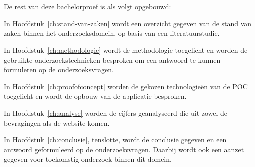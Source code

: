 
\section{}%
\label{sec:opzet-bachelorproef}

De rest van deze bachelorproef is als volgt opgebouwd:

In Hoofdstuk~\ref{ch:stand-van-zaken} wordt een overzicht gegeven van de stand van zaken binnen het onderzoeksdomein, op basis van een literatuurstudie.

In Hoofdstuk~\ref{ch:methodologie} wordt de methodologie toegelicht en worden de gebruikte onderzoekstechnieken besproken om een antwoord te kunnen formuleren op de onderzoeksvragen.

In Hoofdstuk~\ref{ch:proofofconcept} worden de gekozen technologieën van de POC toegelicht en wordt de opbouw van de applicatie besproken.

In Hoofdstuk~\ref{ch:analyse} worden de cijfers geanalyseerd die uit zowel de bevragingen als de website komen.

In Hoofdstuk~\ref{ch:conclusie}, tenslotte, wordt de conclusie gegeven en een antwoord geformuleerd op de onderzoeksvragen. Daarbij wordt ook een aanzet gegeven voor toekomstig onderzoek binnen dit domein.